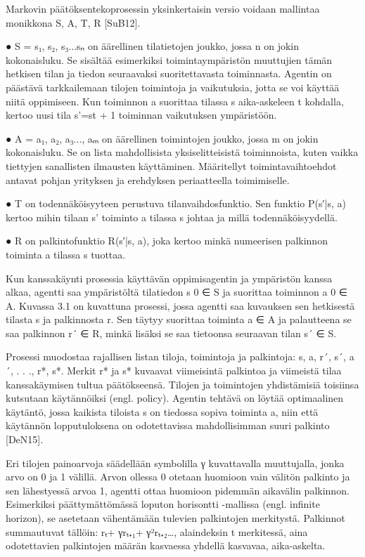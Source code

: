 \documentclass[finnish]{tktltiki2}
\theoremstyle{definition}
\theoremstyle{remark}
\begin{document}
Markovin päätöksentekoprosessin yksinkertaisin versio voidaan mallintaa monikkona {S, A, T, R} [SuB12]. 
 
●   S = {s₁, s₂, s₃...sₙ} on äärellinen tilatietojen joukko, jossa n on jokin kokonaisluku. Se sisältää esimerkiksi toimintaympäristön muuttujien tämän hetkisen tilan ja tiedon seuraavaksi suoritettavasta toiminnasta. Agentin on päästävä tarkkailemaan tilojen toimintoja ja vaikutuksia, jotta se voi käyttää niitä oppimiseen. Kun toiminnon a suorittaa tilassa s aika-askeleen t kohdalla, kertoo uusi tila s’=st + 1 toiminnan vaikutuksen ympäristöön. 
 
●   A = {a₁, a₂, a₃..., aₘ} on äärellinen toimintojen joukko, jossa m on jokin kokonaisluku. Se on lista mahdollisista yksiselitteisistä toiminnoista, kuten vaikka tiettyjen sanallisten ilmausten käyttäminen. Määritellyt toimintavaihtoehdot antavat pohjan yrityksen ja erehdyksen periaatteella toimimiselle. 
 
●   T on todennäköisyyteen perustuva tilanvaihdosfunktio. Sen funktio P(s′|s, a) kertoo mihin tilaan s’ toiminto a tilassa s johtaa ja millä todennäköisyydellä. 
 
●   R on palkintofunktio R(s′|s, a), joka kertoo minkä numeerisen palkinnon toiminta a tilassa s tuottaa. 
 
Kun kanssakäynti prosessia käyttävän oppimisagentin ja ympäristön kanssa alkaa, agentti saa ympäristöltä tilatiedon s 0 ∈ S ja suorittaa toiminnon a 0 ∈ A.  Kuvassa 3.1 on kuvattuna prosessi, jossa agentti saa kuvauksen sen hetkisestä tilasta s ja palkinnosta r. Sen täytyy suorittaa toiminta a ∈ A ja palautteena se saa palkinnon r´ ∈ R, minkä lisäksi se saa tietoonsa seuraavan tilan s´ ∈ S.  
 
Prosessi muodostaa rajallisen listan tiloja, toimintoja ja palkintoja: {s, a, r´, s´, a´, . . ., r*, s*}. Merkit r* ja s* kuvaavat viimeisintä palkintoa ja viimeistä tilaa kanssakäymisen tultua päätökseensä.  Tilojen ja toimintojen yhdistämisiä toisiinsa kutsutaan käytännöiksi (engl. policy). Agentin tehtävä on löytää optimaalinen käytäntö, jossa kaikista tiloista s on tiedossa sopiva toiminta a, niin että käytännön lopputuloksena on odotettavissa mahdollisimman suuri palkinto [DeN15]. 
 
Eri tilojen painoarvoja säädellään symbolilla γ kuvattavalla muuttujalla, jonka arvo on 0 ja 1 välillä. Arvon ollessa 0 otetaan huomioon vain välitön palkinto ja sen lähestyessä arvoa 1, agentti ottaa huomioon pidemmän aikavälin palkinnon. Esimerkiksi päättymättömässä loputon horisontti -mallissa (engl. infinite horizon), se asetetaan vähentämään tulevien palkintojen merkitystä. Palkinnot summautuvat tällöin: {rₜ+ γrₜ₊₁+ γ²rₜ₊₂…}, alaindeksin t merkitessä, aina odotettavien palkintojen määrän kasvaessa yhdellä kasvavaa, aika-askelta.  
 
\end{document}

